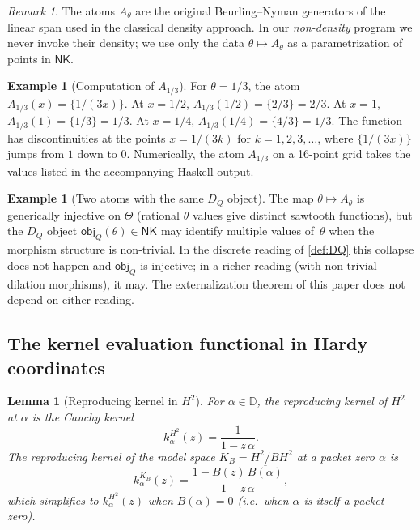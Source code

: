 \documentclass[12pt]{article}
\theoremstyle{plain}
\newtheorem{lemma}[theorem]{Lemma}
\theoremstyle{definition}
\newtheorem{example}[theorem]{Example}
\theoremstyle{remark}
\newtheorem{remark}[theorem]{Remark}
\newcommand{\KB}{K_{B}}
\newcommand{\HardyTwo}{H^{2}}
\newcommand{\Disk}{\mathbb{D}}
\newcommand{\fracpart}[1]{\{#1\}}
\newcommand{\NK}{\mathsf{NK}}
\newcommand{\objQ}{\mathsf{obj}_{Q}}
\begin{document}
\begin{remark}
The atoms $A_\theta$ are the original Beurling--Nyman generators of the
linear span used in the classical density approach.  In our
\emph{non-density} program we never invoke their density; we use only
the data $\theta\mapsto A_\theta$ as a parametrization of points in
$\NK$.
\end{remark}

\begin{example}[Computation of $A_{1/3}$]
\label{ex:atom-1-3}
For $\theta = 1/3$, the atom $A_{1/3}(x) = \fracpart{1/(3x)}$.  At
$x = 1/2$, $A_{1/3}(1/2) = \fracpart{2/3} = 2/3$.  At $x = 1$,
$A_{1/3}(1) = \fracpart{1/3} = 1/3$.  At $x = 1/4$, $A_{1/3}(1/4) =
\fracpart{4/3} = 1/3$.  The function has discontinuities at the
points $x = 1/(3k)$ for $k=1,2,3,\dots$, where $\fracpart{1/(3x)}$
jumps from $1$ down to $0$.  Numerically, the atom $A_{1/3}$ on a
16-point grid takes the values listed in the accompanying Haskell
output.
\end{example}

\begin{example}[Two atoms with the same $D_Q$ object]
\label{ex:two-atoms}
The map $\theta\mapsto A_\theta$ is generically injective on $\Theta$
(rational $\theta$ values give distinct sawtooth functions), but the
$D_Q$ object $\objQ(\theta)\in\NK$ may identify multiple values
of~$\theta$ when the morphism structure is non-trivial.  In the
discrete reading of \cref{def:DQ} this collapse does not happen and
$\objQ$ is injective; in a richer reading (with non-trivial dilation
morphisms), it may.  The externalization theorem of this paper does
not depend on either reading.
\end{example}

\subsection{The kernel evaluation functional in Hardy coordinates}

\begin{lemma}[Reproducing kernel in $\HardyTwo$]
\label{lem:hardy-kernel}
For $\alpha\in\Disk$, the reproducing kernel of $\HardyTwo$ at
$\alpha$ is the Cauchy kernel
\[
  k_\alpha^{\HardyTwo}(z) = \frac{1}{1 - z\,\overline{\alpha}}.
\]
The reproducing kernel of the model space $\KB = \HardyTwo / B
\HardyTwo$ at a packet zero $\alpha$ is
\[
  k_\alpha^{\KB}(z)
  = \frac{1 - B(z)\,\overline{B(\alpha)}}{1 - z\,\overline{\alpha}},
\]
which simplifies to $k_\alpha^{\HardyTwo}(z)$ when
$B(\alpha) = 0$ (i.e.\ when $\alpha$ is itself a packet zero).
\end{lemma}
\end{document}
